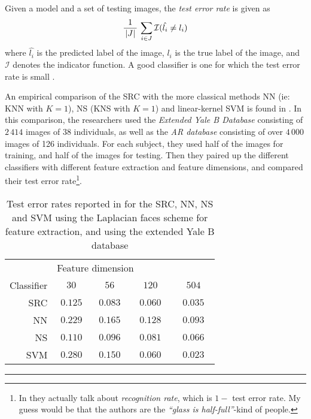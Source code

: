 Given a model and a set of testing images, the \textit{test error rate} is given as
\begin{equation}
	\label{eq:errorrate}
	\dfrac{1}{\,\left|J\right|\,} \, \sum_{i\in J} \mathcal{I}(\hat{l_{i}} \neq l_{i})
\end{equation}
where $ \hat{l_{i}} $ is the predicted label of the image, $ l_{i} $ is the true label of the image, and $ \mathcal{I} $ denotes the indicator function. A good classifier is one for which the test error rate is small \cite[Section~2.2]{ISLR}.

An empirical comparison of the SRC with the more classical methods NN (ie: KNN with $ K = 1 $), NS (KNS with $ K=1 $) and linear-kernel SVM is found in \cite{wright09facerecog}. In this comparison, the researchers used the \textit{Extended Yale B Database} consisting of $ 2\,414 $ images of $ 38 $ individuals, as well as the \textit{AR database} consisting of over $ 4\,000 $ images of 126 individuals. For each subject, they used half of the images for training, and half of the images for testing. Then they paired up the different classifiers with different feature extraction and feature dimensions, and compared their test error rate\footnote{In \cite{wright09facerecog} they actually talk about \textit{recognition rate}, which is $ 1 - $ test error rate. My guess would be that the authors are the \textit{``glass is half-full''}-kind of people.}.

\begin{table}[t]
	\centering
	\renewcommand{\arraystretch}{1.2}
	\begin{tabular}{r | c c c c}
		           & \multicolumn{4}{l}{\quad Feature dimension}                                 \\
		Classifier & $ \quad30\quad $ & $ \quad56\quad $ & $ \quad120\quad $ & $ \quad504\quad $ \\ \hline
		       SRC & $ 0.125 $        & $ 0.083 $        & $ 0.060 $         & $ 0.035 $         \\
		        NN & $ 0.229 $        & $ 0.165 $        & $ 0.128 $         & $ 0.093 $         \\
		        NS & $ 0.110 $        & $ 0.096 $        & $ 0.081 $         & $ 0.066 $         \\
		       SVM & $ 0.280 $        & $  0.150 $       & $ 0.060 $         & $ 0.023 $
	\end{tabular}
	\renewcommand{\arraystretch}{1}
	\caption{Test error rates reported in \cite{wright09facerecog} for the SRC, NN, NS and SVM using the Laplacian faces scheme for feature extraction, and using the extended Yale B database}
	\label{table:errorrates}
	\vspace{4pt}\hrule
\end{table}

